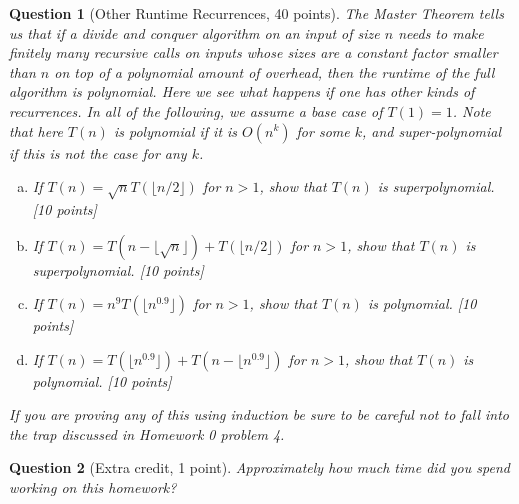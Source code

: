 \documentclass{article}
\newtheorem{ques}{Question}
\begin{document}
\begin{ques}[Other Runtime Recurrences, 40 points]
The Master Theorem tells us that if a divide and conquer algorithm on an input of size $n$ needs to make finitely many recursive calls on inputs whose sizes are a constant factor smaller than $n$ on top of a polynomial amount of overhead, then the runtime of the full algorithm is polynomial. Here we see what happens if one has other kinds of recurrences. In all of the following, we assume a base case of $T(1)=1$. Note that here $T(n)$ is polynomial if it is $O(n^k)$ for some $k$, and super-polynomial if this is not the case for any $k$.
\begin{enumerate}[(a)]
\item If $T(n) = \sqrt{n} T(\lfloor n/2 \rfloor)$ for $n>1$, show that $T(n)$ is superpolynomial. [10 points]
\item If $T(n) = T(n - \lfloor \sqrt{n} \rfloor) + T(\lfloor n/2 \rfloor)$ for $n>1$, show that $T(n)$ is superpolynomial. [10 points]
\item If $T(n) = n^9 T(\lfloor n^{0.9} \rfloor)$ for $n>1$, show that $T(n)$ is polynomial. [10 points]
\item If $T(n) = T(\lfloor n^{0.9} \rfloor) + T(n-\lfloor n^{0.9} \rfloor)$ for $n>1$, show that $T(n)$ is polynomial. [10 points]
\end{enumerate}
If you are proving any of this using induction be sure to be careful not to fall into the trap discussed in Homework 0 problem 4.
\end{ques}

\begin{ques}[Extra credit, 1 point]
Approximately how much time did you spend working on this homework?
\end{ques}
\end{document}
